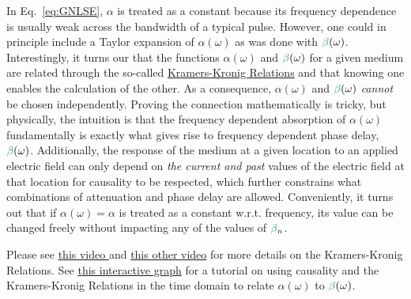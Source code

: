 In Eq.~\ref{eq:GNLSE}, $\alpha$ is treated as a constant because its frequency dependence is usually weak across the bandwidth of a typical pulse. However, one could in principle include a Taylor expansion of $\alpha(\omega)$ as was done with $\betag(\omega)$. Interestingly, it turns our that the functions $\alpha(\omega)$ and $\betag(\omega)$ for a given medium are related through the so-called \href{https://en.wikipedia.org/wiki/Kramers%E2%80%93Kronig_relations#Related_proof_from_the_time_domain}{Kramers-Kronig Relations} and that knowing one enables the calculation of the other. As a consequence, $\alpha(\omega)$ and $\betag(\omega)$ \emph{cannot} be chosen independently. Proving the connection mathematically is tricky, but physically, the intuition is that the frequency dependent absorption  of $\alpha(\omega)$ fundamentally is exactly what gives rise to frequency dependent phase delay, $\betag(\omega)$. Additionally, the response of the medium at a given location to an applied electric field can only depend on \emph{the current and past} values of the electric field at that location for causality to be respected, which further constrains what combinations of attenuation and phase delay are allowed. Conveniently, it turns out that if $\alpha(\omega)=\alpha$ is treated as a constant w.r.t. frequency, its value can be changed freely without impacting any of the values of $\betag_n$.  

Please see \href{https://www.youtube.com/watch?v=vzBnsG2rKWs}{this video } and \href{https://www.youtube.com/watch?v=rFTUTxPHYYw}{this other video} for more details on the Kramers-Kronig Relations. See \href{https://www.desmos.com/calculator/1zymtgbbrv}{this interactive graph} for a tutorial on using causality and the Kramers-Kronig Relations in the time domain to relate $\alpha(\omega)$ to $\betag(\omega)$.

